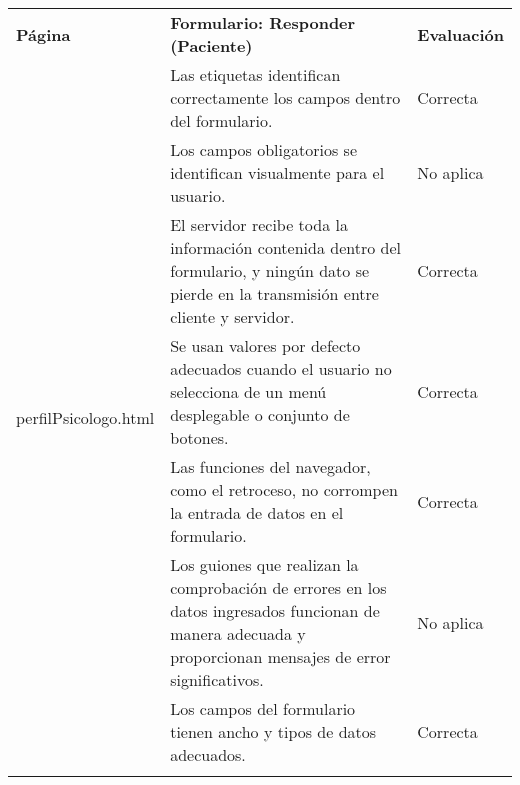 \begin{table}[htpb]
\centering
\begin{tabularx}{\textwidth}{|l|X|l|}
\hline
\rowcolor[gray]{0.9}\multicolumn{3}{|l|}{\textbf{Anexo PI-010}}                                                                                                                                                                               \\ \hline
\textbf{Página}                        & \textbf{Formulario: Responder (Paciente)}                                                                                                                 & \textbf{Evaluación} \\ \hline
\multirow{10}{*}{perfilPsicologo.html} & Las etiquetas identifican correctamente los campos dentro del formulario.                                                                                 & Correcta            \\ \cline{2-3} 
                                       & Los campos obligatorios se identifican visualmente para el usuario.                                                                                       & No aplica           \\ \cline{2-3} 
                                       & El servidor recibe toda la información contenida dentro del formulario, y ningún dato se pierde en la transmisión entre cliente y servidor.               & Correcta            \\ \cline{2-3} 
                                       & Se usan valores por defecto adecuados cuando el usuario no selecciona de un menú desplegable o conjunto de botones.                                       & Correcta            \\ \cline{2-3} 
                                       & Las funciones del navegador, como el retroceso, no corrompen la entrada de datos en el formulario.                                                        & Correcta            \\ \cline{2-3} 
                                       & Los guiones que realizan la comprobación de errores en los datos ingresados funcionan de manera adecuada y proporcionan mensajes de error significativos. & No aplica           \\ \cline{2-3} 
                                       & Los campos del formulario tienen ancho y tipos de datos adecuados.                                                                                        & Correcta            \\ \cline{2-3} 

\end{tabularx}
\end{table}
